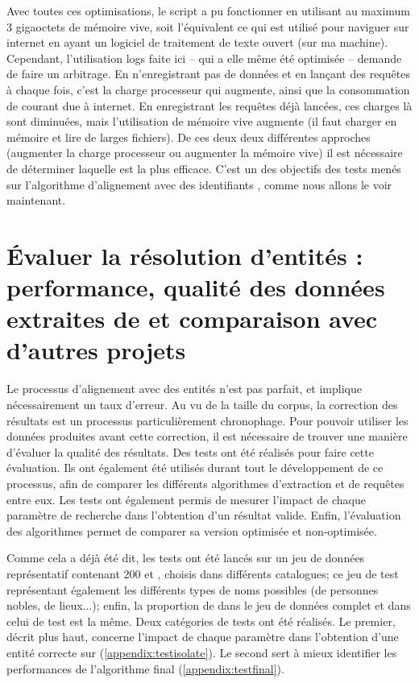 Avec toutes ces optimisations, le script a pu fonctionner en utilisant au maximum 3 gigaoctets de mémoire vive, soit l'équivalent ce qui est utilisé pour naviguer sur internet en ayant un logiciel de traitement de texte ouvert (sur ma machine). Cependant, l'utilisation \glspl{log} faite ici -- qui a elle même été optimisée -- demande de faire un arbitrage. En n'enregistrant pas de données et en lançant des requêtes à chaque fois, c'est la charge processeur qui augmente, ainsi que la consommation de courant due à internet. En enregistrant les requêtes déjà lancées, ces charges là sont diminuées, mais l'utilisation de mémoire vive augmente (il faut charger en mémoire et lire de larges fichiers). De ces deux deux différentes approches (augmenter la charge processeur ou augmenter la mémoire vive) il est nécessaire de déterminer laquelle est la plus efficace. C'est un des objectifs des tests menés sur l'algorithme d'alignement avec des identifiants \wkd{}, comme nous allons le voir maintenant.

\section{Évaluer la résolution d'entités : performance, qualité des données extraites de \wkd{} et comparaison avec d'autres projets}
Le processus d'alignement avec des entités \wkd{} n'est pas parfait, et implique nécessairement un taux d'erreur. Au vu de la taille du corpus, la correction des résultats est un processus particulièrement chronophage. Pour pouvoir utiliser les données produites avant cette correction, il est nécessaire de trouver une manière d'évaluer la qualité des résultats. Des tests ont été réalisés pour faire cette évaluation. Ils ont également été utilisés durant tout le développement de ce processus, afin de comparer les différents algorithmes d'extraction et de requêtes entre eux. Les tests ont également permis de mesurer l'impact de chaque paramètre de recherche dans l'obtention d'un résultat valide. Enfin, l'évaluation des algorithmes permet de comparer sa version optimisée et non-optimisée.

Comme cela a déjà été dit, les tests ont été lancés sur un jeu de données représentatif contenant 200 \tname{} et \ttrait{}, choisis dans différents catalogues; ce jeu de test représentant également les différents types de noms possibles (de personnes nobles, de lieux...); enfin, la proportion de \ttrait{} dans le jeu de données complet et dans celui de test est la même. Deux catégories de tests ont été réalisés. Le premier, décrit plus haut, concerne l'impact de chaque paramètre dans l'obtention d'une entité correcte sur \wkd{} (\ref{appendix:testisolate}). Le second sert à mieux identifier les performances de l'algorithme final (\ref{appendix:testfinal}). 

